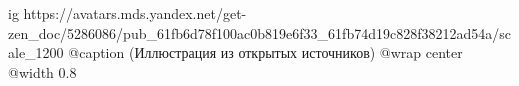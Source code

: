  
 
 
 
 

\ifcmt
  ig https://avatars.mds.yandex.net/get-zen_doc/5286086/pub_61fb6d78f100ac0b819e6f33_61fb74d19c828f38212ad54a/scale_1200
	@caption (Иллюстрация из открытых источников)
  @wrap center
  @width 0.8
\fi
